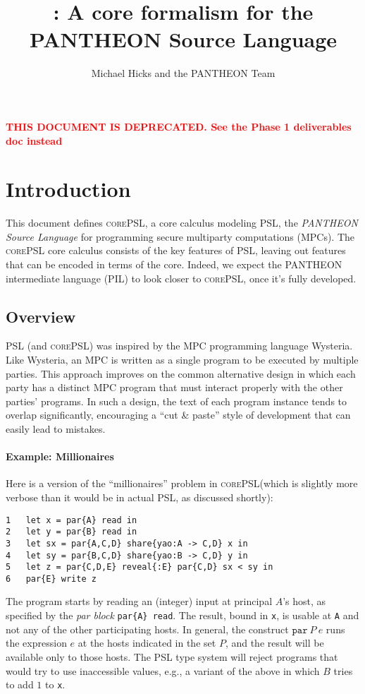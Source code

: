 \documentclass[10pt]{article}
\title{\lang: A core formalism for the PANTHEON Source Language}
\author{Michael Hicks and the PANTHEON Team}
\newcommand{\kw}[1]{\ensuremath{\mathtt{#1}}}
\newcommand{\epar}[2]{\ensuremath{\kw{par}~{#1}~{#2}}}
\newcommand{\lang}{\textsc{corePSL}\xspace}
\begin{document}
\maketitle

\textcolor{red}{\textbf{THIS DOCUMENT IS DEPRECATED. See the Phase 1 deliverables doc instead}}

\section{Introduction}

This document defines \lang, a core calculus modeling PSL, the
\emph{PANTHEON Source Language} for programming secure multiparty
computations (MPCs). The \lang core calculus consists of the key features of PSL,
leaving out features that can be encoded in terms of the core. Indeed,
we expect the PANTHEON intermediate language (PIL) to look closer to
\lang, once it's fully developed.

\subsection{Overview}
\label{sec:overview}

PSL (and \lang) was inspired by the MPC programming language
Wysteria. Like Wysteria, an MPC is written as a single program to be
executed by multiple parties. This approach improves on the common
alternative design in which each party has a distinct MPC
program that must interact properly with the other parties'
programs. In such a design, the text of each program instance tends to
overlap significantly, encouraging a ``cut \& paste'' style of
development that can easily lead to mistakes.

\paragraph{Example: Millionaires}

Here is a version of the ``millionaires'' problem in \lang (which is
slightly more verbose than it would be in actual PSL, as discussed shortly):
\begin{verbatim}
1   let x = par{A} read in
2   let y = par{B} read in
3   let sx = par{A,C,D} share{yao:A -> C,D} x in
4   let sy = par{B,C,D} share{yao:B -> C,D} y in
5   let z = par{C,D,E} reveal{:E} par{C,D} sx < sy in
6   par{E} write z
\end{verbatim}
The program starts by reading an (integer) input at principal $A$'s
host, as specified by the \emph{par block} \texttt{par\{A\} read}. The
result, bound in \texttt{x}, is usable at \texttt{A} and not any of
the other participating hosts. In  
general, the construct $\epar{P}{e}$ runs the expression $e$ at the
hosts indicated in the set $P$, and the result will be available only
to those hosts. The PSL type system will reject programs that would
try to use inaccessible values, e.g., a variant of the above in
which $B$ tries to add $1$ to \texttt{x}.
\end{document}
